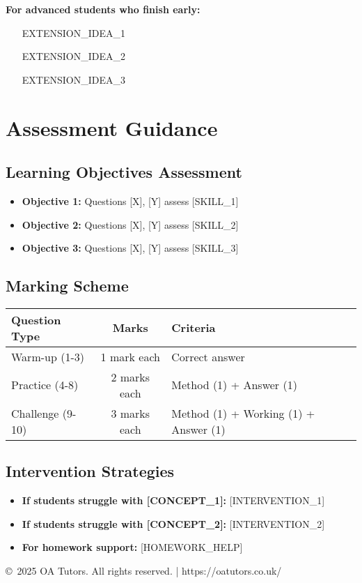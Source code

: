 \documentclass[a4paper,12pt]{article}
\begin{document}
\begin{extension}
\textbf{For advanced students who finish early:}
\begin{itemize}
    \item [EXTENSION_IDEA_1]
    \item [EXTENSION_IDEA_2]
    \item [EXTENSION_IDEA_3]
\end{itemize}
\end{extension}

\section{Assessment Guidance}

\subsection{Learning Objectives Assessment}
\begin{itemize}
    \item \textbf{Objective 1:} Questions [X], [Y] assess [SKILL_1]
    \item \textbf{Objective 2:} Questions [X], [Y] assess [SKILL_2]
    \item \textbf{Objective 3:} Questions [X], [Y] assess [SKILL_3]
\end{itemize}

\subsection{Marking Scheme}
\begin{center}
\begin{tabular}{|l|c|l|}
\hline
\textbf{Question Type} & \textbf{Marks} & \textbf{Criteria} \\
\hline
Warm-up (1-3) & 1 mark each & Correct answer \\
\hline
Practice (4-8) & 2 marks each & Method (1) + Answer (1) \\
\hline
Challenge (9-10) & 3 marks each & Method (1) + Working (1) + Answer (1) \\
\hline
\end{tabular}
\end{center}

\subsection{Intervention Strategies}
\begin{itemize}
    \item \textbf{If students struggle with [CONCEPT_1]:} [INTERVENTION_1]
    \item \textbf{If students struggle with [CONCEPT_2]:} [INTERVENTION_2]
    \item \textbf{For homework support:} [HOMEWORK_HELP]
\end{itemize}

\vfill
\begin{center}
\textcolor{oagray}{\small \copyright\ 2025 OA Tutors. All rights reserved. | https://oatutors.co.uk/}
\end{center}
\end{document}
